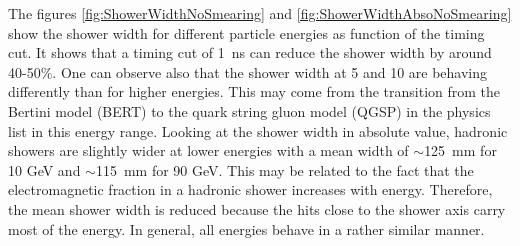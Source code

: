 The figures \ref{fig:ShowerWidthNoSmearing} and \ref{fig:ShowerWidthAbsoNoSmearing} show the shower width for different particle energies as function of the timing cut. It shows that a timing cut of \SI{1}{\nano\second} can reduce the shower width by around 40-50\%. One can observe also that the shower width at 5 and 10 \GeV are behaving differently than for higher energies. This may come from the transition from the Bertini model (BERT) to the quark string gluon model (QGSP) in the physics list in this energy range. Looking at the shower width in absolute value, hadronic showers are slightly wider at lower energies with a mean width of $\sim$\SI{125}{\milli\meter} for 10 GeV and $\sim$\SI{115}{\milli\meter} for 90 GeV. This may be related to the fact that the electromagnetic fraction in a hadronic shower increases with energy. Therefore, the mean shower width is reduced because the hits close to the shower axis carry most of the energy. In general, all energies behave in a rather similar manner.

